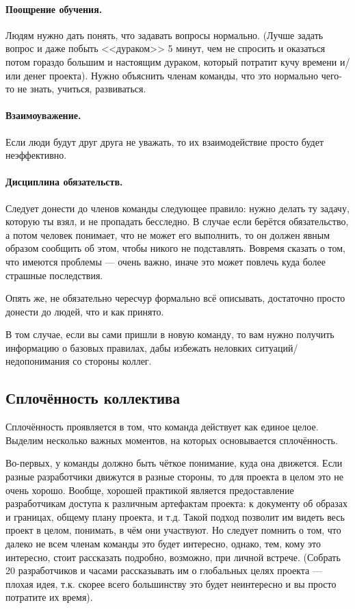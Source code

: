 \documentclass{../../text-style}
\begin{document}
\paragraph*{Поощрение обучения.} Людям нужно дать понять, что задавать вопросы нормально. (Лучше задать вопрос и даже побыть <<дураком>> 5 минут, чем не спросить и оказаться потом гораздо большим и настоящим дураком, который потратит кучу времени и/или денег проекта). Нужно объяснить членам команды, что это нормально чего-то не знать, учиться, развиваться.

\paragraph*{Взаимоуважение.} Если люди будут друг друга не уважать, то их взаимодействие просто будет неэффективно.

\paragraph*{Дисциплина обязательств.} Следует донести до членов команды следующее правило: нужно делать ту задачу, которую ты взял, и не пропадать бесследно. В случае если берётся обязательство, а потом человек понимает, что не может его выполнить, то он должен явным образом сообщить об этом, чтобы никого не подставлять. Вовремя сказать о том, что имеются проблемы --- очень важно, иначе это может повлечь куда более страшные последствия.

Опять же, не обязательно чересчур формально всё описывать, достаточно просто донести до людей, что и как принято.

В том случае, если вы сами пришли в новую команду, то вам нужно получить информацию о базовых правилах, дабы избежать неловких ситуаций/недопонимания со стороны коллег. 

\subsection{Сплочённость коллектива}

Сплочённость проявляется в том, что команда действует как единое целое. Выделим несколько важных моментов, на которых основывается сплочённость.

Во-первых, у команды должно быть чёткое понимание, куда она движется. Если разные разработчики движутся в разные стороны, то для проекта в целом это не очень хорошо. Вообще, хорошей практикой является предоставление разработчикам доступа к различным артефактам проекта: к документу об образах и границах, общему плану проекта, и т.д. Такой подход позволит им видеть весь проект в целом, понимать, в чём они участвуют. Но следует помнить о том, что далеко не всем членам команды это будет интересно, однако, тем, кому это интересно, стоит рассказать подробно, возможно, при личной встрече. (Собрать 20 разработчиков и часами рассказывать им о глобальных целях проекта --- плохая идея, т.к. скорее всего большинству это будет неинтересно и вы просто потратите их время).
\end{document}
